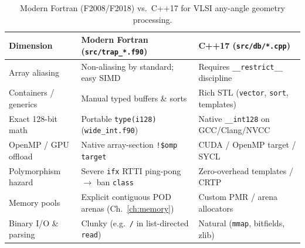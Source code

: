 \begin{table}[htbp]
\centering
\caption{Modern Fortran (F2008/F2018) vs.\ C++17 for VLSI any-angle geometry processing.}
\label{tab:fortran_vs_cpp}
\small
\begin{tabular}{@{}p{3.0cm}p{5.5cm}p{5.5cm}@{}}
\toprule
\textbf{Dimension} & \textbf{Modern Fortran (\texttt{src/trap\_*.f90})} & \textbf{C++17 (\texttt{src/db/*.cpp})} \\
\midrule
Array aliasing & Non-aliasing by standard; easy SIMD & Requires \texttt{\_\_restrict\_\_} discipline \\
Containers / generics & Manual typed buffers \& sorts & Rich STL (\texttt{vector}, \texttt{sort}, templates) \\
Exact 128-bit math & Portable \texttt{type(i128)} (\texttt{wide\_int.f90}) & Native \texttt{\_\_int128} on GCC/Clang/NVCC \\
OpenMP / GPU offload & Native array-section \texttt{!\$omp target} & CUDA / OpenMP target / SYCL \\
Polymorphism hazard & Severe \texttt{ifx} RTTI ping-pong $\to$ ban \texttt{class} & Zero-overhead templates / CRTP \\
Memory pools & Explicit contiguous POD arenas (Ch.~\ref{ch:memory}) & Custom PMR / arena allocators \\
Binary I/O \& parsing & Clunky (e.g.\ \texttt{/} in list-directed \texttt{read}) & Natural (\texttt{mmap}, bitfields, zlib) \\
\bottomrule
\end{tabular}
\end{table}

